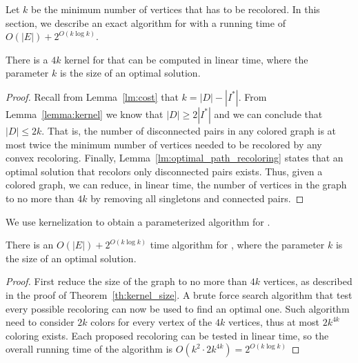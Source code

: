 \label{sec:fpt}

Let $k$ be the minimum number of vertices that has to be recolored. In this
section, we describe an exact algorithm for \TWOCR{} with a running time
of $O(|E|) + 2^{O(k \log k)}$.

\begin{theorem}
\label{th:kernel_size}
There is a $4k$ kernel for \TWOCR{} that can be computed in linear time, where the
parameter $k$ is the size of an optimal solution.
\end{theorem}

\begin{proof}
Recall from Lemma~\ref{lm:cost} that $k = |D| - |I^*|$.
From Lemma~\ref{lemma:kernel} we know that $|D| \geq 2|I^*|$ and we can
conclude that $|D| \leq 2k$.
That is, the number of disconnected pairs in any colored graph is at most twice
the minimum number of vertices needed to be recolored by any convex recoloring.
Finally, Lemma~\ref{lm:optimal_path_recoloring} states that an optimal solution
that recolors only disconnected pairs exists.
Thus, given a colored graph, we can reduce, in linear time, the number of
vertices in the graph to no more than $4k$ by removing all singletons and connected
pairs.{}
\end{proof}

We use kernelization to obtain a parameterized algorithm for \TWOCR{}.

\begin{theorem}
There is an $O(|E|) + 2^{O(k\log{k})}$ time algorithm for \TWOCR{}, where
the parameter $k$ is the size of an optimal solution.
\end{theorem}

\begin{proof}
	First reduce the size of the graph to no more than $4k$ vertices, as described
	in the proof of Theorem~\ref{th:kernel_size}.
	A brute force search algorithm
	that test every possible recoloring can now be used to find an optimal one.
	Such algorithm need to consider $2k$ colors for every vertex of the $4k$
	vertices, thus at most $2k^{4k}$ coloring exists. 
	Each proposed recoloring can be tested in linear time, so the overall running
	time of the algorithm is $O(k^2 \cdot 2k^{4k}) =  2^{O(k\log{k})}$
{}\end{proof}

